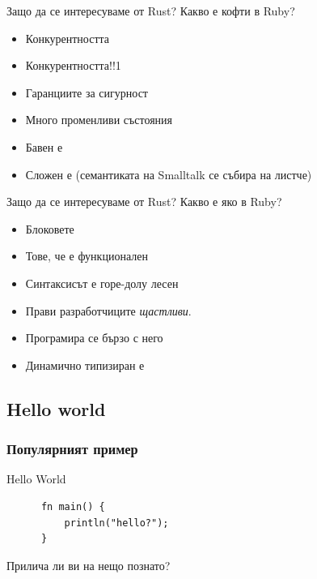 \documentclass[xcolor=x11names,compress]{beamer}
\renewcommand{\(}{\begin{columns}}
\renewcommand{\)}{\end{columns}}
\newcommand{\<}[1]{\begin{column}{#1}}
\renewcommand{\>}{\end{column}}
\begin{document}
\begin{frame}{Защо да се интересуваме от Rust?}
  Какво е кофти в Ruby?

  \pause
  \begin{itemize}[<+->]
  \item Конкурентността
  \item Конкурентността!!1
  \item Гаранциите за сигурност
  \item Много променливи състояния
  \item Бавен е
  \item Сложен е (семантиката на Smalltalk се събира на листче)
  \end{itemize}
\end{frame}

\begin{frame}{Защо да се интересуваме от Rust?}
  Какво е яко в Ruby?

  \pause
  \begin{itemize}[<+->]
  \item Блоковете
  \item Тове, че е функционален
  \item Синтаксисът е горе-долу лесен
  \item Прави разработчиците \emph{щастливи}.
  \item Програмира се бързо с него
  \item Динамично типизиран е
  \end{itemize}
\end{frame}

\subsection{Hello world}
\begin{frame}[fragile]
  \frametitle{Популярният пример}

  \pause
  \begin{block}{Hello World}
    \begin{lstlisting}
      fn main() {
          println("hello?");
      }
    \end{lstlisting}
  \end{block}

  \pause \vspace{1cm}
  Прилича ли ви на нещо познато?
\end{frame}
\end{document}
